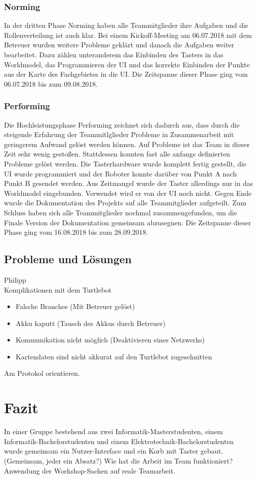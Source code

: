\documentclass[a4paper,12pt,headsepline]{scrartcl}
\begin{document}
	\subsubsection{Norming}
		In der dritten Phase Norming haben alle Teammitglieder ihre Aufgaben und die Rollenverteilung ist auch klar. Bei einem Kickoff-Meeting am 06.07.2018 mit dem Betreuer wurden weitere Probleme geklärt und danach die Aufgaben weiter bearbeitet. Dazu zählen unteranderem das Einbinden des Tasters in das Worldmodel, das Programmieren der UI und das korrekte Einbinden der Punkte aus der Karte des Fachgebietes in die UI. Die Zeitspanne dieser Phase ging vom 06.07.2018 bis zum 09.08.2018.
	\subsubsection{Performing}
		Die Hochleistungsphase Performing zeichnet sich dadurch aus, dass durch die steigende Erfahrung der Teammitlglieder Probleme in Zusammenarbeit mit geringerem Aufwand gelöst werden können. Auf Probleme ist das Team in dieser Zeit sehr wenig gestoßen. Stattdessen konnten fast alle anfangs definierten Probleme gelöst werden. Die Tasterhardware wurde komplett fertig gestellt, die UI wurde programmiert und der Roboter konnte darüber von Punkt A nach Punkt B gesendet werden. Aus Zeitmangel wurde der Taster allerdings nur in das Worldmodel eingebunden. Verwendet wird er von der UI noch nicht. Gegen Ende wurde die Dokumentation des Projekts auf alle Teammitglieder aufgeteilt. Zum Schluss haben sich alle Teammitglieder nochmal zusammengefunden, um die Finale Version der Dokumentation gemeinsam abzusegnen. Die Zeitspanne dieser Phase ging vom 16.08.2018 bis zum 28.09.2018.
	\subsection{Probleme und Lösungen}
		Philipp\\
		Komplikationen mit dem Turtlebot
		\begin{itemize}
			\item Falsche Branches (Mit Betreuer gelöst)
			\item Akku kaputt (Tausch des Akkus durch Betreuer)
			\item Kommunikation nicht möglich (Deaktivieren eines Netzwerks)
			\item Kartendaten sind nicht akkurat auf den Turtlebot zugeschnitten
		\end{itemize}
		Am Protokol orientieren.
	\section{Fazit}
		In einer Gruppe bestehend aus zwei Informatik-Masterstudenten, einem Informatik-Bachelorstudenten und einem Elektrotechnik-Bachelorstudenten wurde gemeinsam ein Nutzer-Interface und ein Korb mit Taster gebaut.\\
		(Gemeinsam, jeder ein Absatz?)
		Wie hat die Arbeit im Team funktioniert? Anwendung der Workshop-Sachen auf reale Teamarbeit.
		
\end{document}
